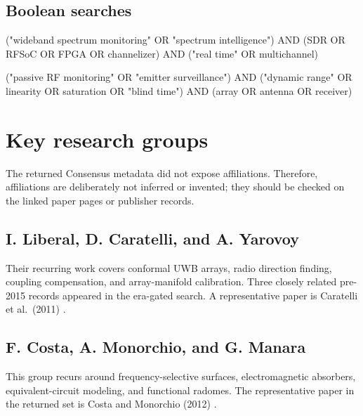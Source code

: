 \documentclass[
  10pt,
]{article}
\newenvironment{Shaded}{}{}
\newcommand{\NormalTok}[1]{#1}
\begin{document}
\subsection{Boolean searches}\label{boolean-searches-4}

\begin{Shaded}
\begin{Highlighting}[]
\NormalTok{("wideband spectrum monitoring" OR "spectrum intelligence")}
\NormalTok{AND (SDR OR RFSoC OR FPGA OR channelizer)}
\NormalTok{AND ("real time" OR multichannel)}
\end{Highlighting}
\end{Shaded}

\begin{Shaded}
\begin{Highlighting}[]
\NormalTok{("passive RF monitoring" OR "emitter surveillance")}
\NormalTok{AND ("dynamic range" OR linearity OR saturation OR "blind time")}
\NormalTok{AND (array OR antenna OR receiver)}
\end{Highlighting}
\end{Shaded}

\section{Key research groups}\label{key-research-groups}

The returned Consensus metadata did not expose affiliations. Therefore,
affiliations are deliberately not inferred or invented; they should be
checked on the linked paper pages or publisher records.

\subsection{I. Liberal, D. Caratelli, and A.
Yarovoy}\label{i.-liberal-d.-caratelli-and-a.-yarovoy}

Their recurring work covers conformal UWB arrays, radio direction
finding, coupling compensation, and array-manifold calibration. Three
closely related pre-2015 records appeared in the era-gated search. A
representative paper is Caratelli et al.~(2011) \citep{caratelli2011}.

\subsection{F. Costa, A. Monorchio, and G.
Manara}\label{f.-costa-a.-monorchio-and-g.-manara}

This group recurs around frequency-selective surfaces, electromagnetic
absorbers, equivalent-circuit modeling, and functional radomes. The
representative paper in the returned set is Costa and Monorchio (2012)
\citep{costa2012}.
\end{document}
